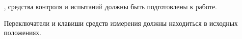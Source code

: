 \dut, средства контроля и испытаний должны быть подготовлены к работе.

Переключатели и клавиши средств измерения должны находиться в исходных положениях.